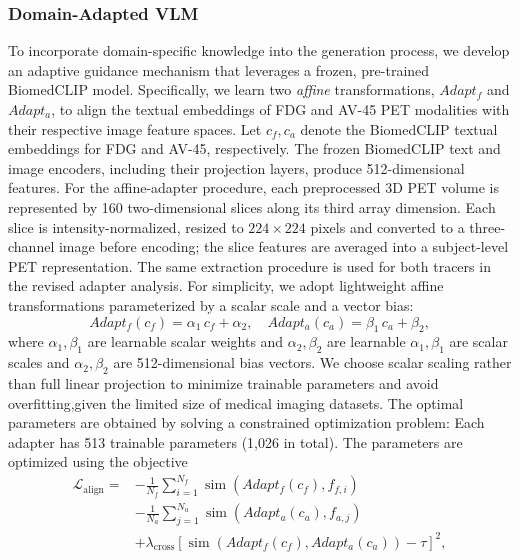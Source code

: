 \documentclass{article}
\providecommand{\DIFaddtex}[1]{{\protect\color{blue} \sf #1}} %
\providecommand{\DIFdeltex}[1]{{\protect\color{red} \scriptsize #1}} %
\providecommand{\DIFaddbegin}{} %
\providecommand{\DIFaddend}{} %
\providecommand{\DIFdelbegin}{} %
\providecommand{\DIFdelend}{} %
\providecommand{\DIFadd}[1]{\texorpdfstring{\DIFaddtex{#1}}{#1}} %
\providecommand{\DIFdel}[1]{\texorpdfstring{\DIFdeltex{#1}}{}} %
\newcommand{\DIFscaledelfig}{0.5}
\newlength{\DIFdelgraphicswidth} %
\newlength{\DIFdelgraphicsheight} %
\newcommand{\DIFaddincludegraphics}[2][]{{\color{blue}\fbox{\DIFOincludegraphics[#1]{#2}}}} %
\newcommand{\DIFdelincludegraphics}[2][]{%
\sbox{\DIFdelgraphicsbox}{\DIFOincludegraphics[#1]{#2}}%
\settoboxwidth{\DIFdelgraphicswidth}{\DIFdelgraphicsbox} %
\settoboxtotalheight{\DIFdelgraphicsheight}{\DIFdelgraphicsbox} %
\scalebox{\DIFscaledelfig}{%
\parbox[b]{\DIFdelgraphicswidth}{\usebox{\DIFdelgraphicsbox}\\[-\baselineskip] \rule{\DIFdelgraphicswidth}{0em}}\llap{\resizebox{\DIFdelgraphicswidth}{\DIFdelgraphicsheight}{%
\setlength{\unitlength}{\DIFdelgraphicswidth}%
\begin{picture}(1,1)%
\thicklines\linethickness{2pt} %
{\color[rgb]{1,0,0}\put(0,0){\framebox(1,1){}}}%
{\color[rgb]{1,0,0}\put(0,0){\line( 1,1){1}}}%
{\color[rgb]{1,0,0}\put(0,1){\line(1,-1){1}}}%
\end{picture}%
}\hspace*{3pt}}} %
} %
\DeclareRobustCommand{\DIFaddbegin}{\DIFOaddbegin \let\includegraphics\DIFaddincludegraphics} %
\DeclareRobustCommand{\DIFaddend}{\DIFOaddend \let\includegraphics\DIFOincludegraphics} %
\DeclareRobustCommand{\DIFdelbegin}{\DIFOdelbegin \let\includegraphics\DIFdelincludegraphics} %
\DeclareRobustCommand{\DIFdelend}{\DIFOaddend \let\includegraphics\DIFOincludegraphics} %
\begin{document}
\subsubsection{Domain-Adapted VLM}
To incorporate domain-specific knowledge into the generation process, we develop an adaptive guidance mechanism that leverages a frozen, pre-trained BiomedCLIP model. Specifically, we learn two \textit{affine} transformations, $Adapt_f$ and $Adapt_a$, to align the textual embeddings of FDG and AV-45 PET modalities with their respective image feature spaces. Let $c_f, c_a$ denote the BiomedCLIP textual embeddings for FDG and AV-45, respectively. \DIFaddbegin \DIFadd{The frozen BiomedCLIP text and image encoders, including their projection layers, produce 512-dimensional features. For the affine-adapter procedure, each preprocessed 3D PET volume is represented by 160 two-dimensional slices along its third array dimension. Each slice is intensity-normalized, resized to $224\times224$ pixels and converted to a three-channel image before encoding; the slice features are averaged into a subject-level PET representation. The same extraction procedure is used for both tracers in the revised adapter analysis.
}\DIFaddend For simplicity, we adopt lightweight affine transformations parameterized by a scalar scale and a vector bias:
\[
Adapt_f(c_f) = \alpha_1 \, c_f + \alpha_2, \quad
Adapt_a(c_a) = \beta_1 \, c_a + \beta_2,
\]
where \DIFdelbegin \DIFdel{$\alpha_1, \beta_1 $ are learnable scalar weights and $\alpha_2, \beta_2 $ are learnable }\DIFdelend \DIFaddbegin \DIFadd{$\alpha_1,\beta_1$ are scalar scales and $\alpha_2,\beta_2$ are 512-dimensional }\DIFaddend bias vectors. \DIFdelbegin \DIFdel{We choose scalar scaling rather than full linear projection to minimize trainable parameters and avoid overfitting,given the limited size of medical imaging datasets. The optimal parameters are obtained by solving a constrained optimization problem:
}\DIFdelend \DIFaddbegin \DIFadd{Each adapter has 513 trainable parameters (1,026 in total). The parameters are optimized using the objective
}\DIFaddend \begin{equation}
\DIFdelbegin %
\DIFdelend \DIFaddbegin \begin{aligned}
\mathcal{L}_{\mathrm{align}}={}&-\frac{1}{N_f}\sum_{i=1}^{N_f}\operatorname{sim}(Adapt_f(c_f),f_{f,i})\\
&-\frac{1}{N_a}\sum_{j=1}^{N_a}\operatorname{sim}(Adapt_a(c_a),f_{a,j})\\
&+\lambda_{\mathrm{cross}}\left[\operatorname{sim}(Adapt_f(c_f),Adapt_a(c_a))-\tau\right]^2,
\end{aligned}\DIFaddend 
\label{eq:align_opt}
\end{equation}
\end{document}
